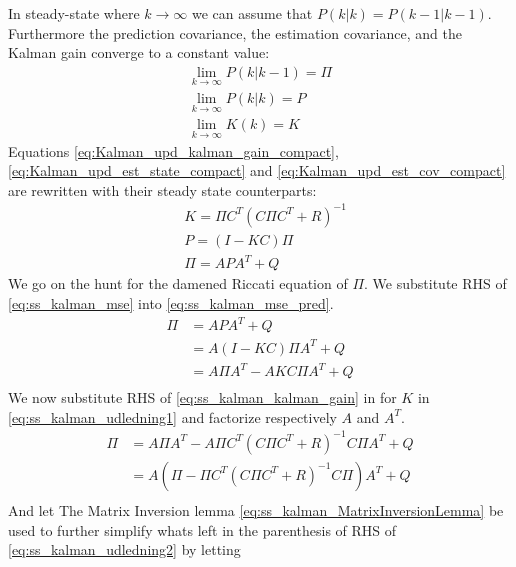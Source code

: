 In steady-state where $k \rightarrow \infty$ we can assume that ${P}(k|k) = {P}(k-1|k-1) $. Furthermore the prediction covariance, the estimation covariance, and the Kalman gain converge to a constant value:
\begin{equation}
	\begin{gathered}
		\lim_{k \to \infty}	{P}(k|k-1) =  \Pi \\
		\lim_{k \to \infty} {P}(k|k) = P \\
		\lim_{k \to \infty} {K}(k) = K
	\end{gathered}
\end{equation}
Equations \cref{eq:Kalman_upd_kalman_gain_compact}, \cref{eq:Kalman_upd_est_state_compact} and \cref{eq:Kalman_upd_est_cov_compact} are rewritten with their steady state counterparts:
\begin{align}
	& K = \Pi {C}^T ({C} \Pi {C}^T + {R})^{-1} \label{eq:ss_kalman_kalman_gain} \\
	& P = ({I} - K {C}) \Pi \label{eq:ss_kalman_mse} \\
	& \Pi = {A}P{A}^T + {Q} \label{eq:ss_kalman_mse_pred}
\end{align}
We go on the hunt for the damened Riccati equation of $\Pi$. We substitute RHS of \cref{eq:ss_kalman_mse} into \cref{eq:ss_kalman_mse_pred}.
\begin{equation}
	\begin{split}\label{eq:ss_kalman_udledning1}
		\Pi 	& = {A}P A^T + Q \\
		& = {A} ({I}-K{C}) \Pi {A}^T + {Q}\\
		& = {A} \Pi {A}^T - {A} K {C} \Pi  {A}^T + {Q}\\
		\end{split}
\end{equation}
We now substitute RHS of \cref{eq:ss_kalman_kalman_gain} in for $K$ in \cref{eq:ss_kalman_udledning1} and factorize respectively ${A}$ and $ {A}^T $.
\begin{equation}
	\begin{split}\label{eq:ss_kalman_udledning2}
		\Pi & = {A} \Pi {A}^T - {A} \Pi {C}^T ({C} \Pi {C}^T + {R})^{-1} {C} \Pi {A}^T + {Q}\\
		& = {A} (\Pi - \Pi {C}^T ({C} \Pi {C}^T + {R})^{-1} {C} \Pi) {A}^T + {Q}\\
	\end{split}
\end{equation}
And let The Matrix Inversion lemma \cref{eq:ss_kalman_MatrixInversionLemma} be used to further simplify whats left in the parenthesis of RHS of \cref{eq:ss_kalman_udledning2} by letting
